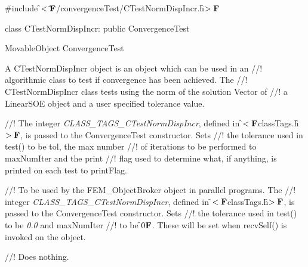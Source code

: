 
\indent \#include \f$<\tilde{}{\bf F}$/convergenceTest/CTestNormDispIncr.h\f$>{\bf F}$

\indent class CTestNormDispIncr: public ConvergenceTest

\indent MovableObject
\indent\indent ConvergenceTest
\indent\indent{}

\indent A CTestNormDispIncr object is an object which can be used in an
//! algorithmic class to test if convergence has been achieved. The
//! CTestNormDispIncr class tests using the norm of the solution Vector of
//! a LinearSOE object and a user specified tolerance value. 


\indent{} 
\indent{} 
\indent{}
\indent{} 
\indent{}
\indent{} 
\indent{}
\indent{}
\indent{}
\indent{}
\indent{} 
\indent{} 

//! The integer {\em CLASS\_TAGS\_CTestNormDispIncr}, defined in
\f$<{\bf F}$classTags.h\f$>{\bf F}$, is passed to the ConvergenceTest constructor. Sets
//! the tolerance used in test() to be \p tol, the max number
//! of iterations to be performed to \p maxNumIter and the print
//! flag used to determine what, if anything, is printed on each test to
\p printFlag.


//! To be used by the FEM\_ObjectBroker object in parallel programs. The
//! integer {\em CLASS\_TAGS\_CTestNormDispIncr}, defined in
\f$<{\bf F}$classTags.h\f$>{\bf F}$, is passed to the ConvergenceTest constructor. Sets
//! the tolerance used in test() to be {\em 0.0} and \p maxNumIter 
//! to be \f$0{\bf F}$. These will be set when recvSelf() is invoked on the object.


//! Does nothing.

